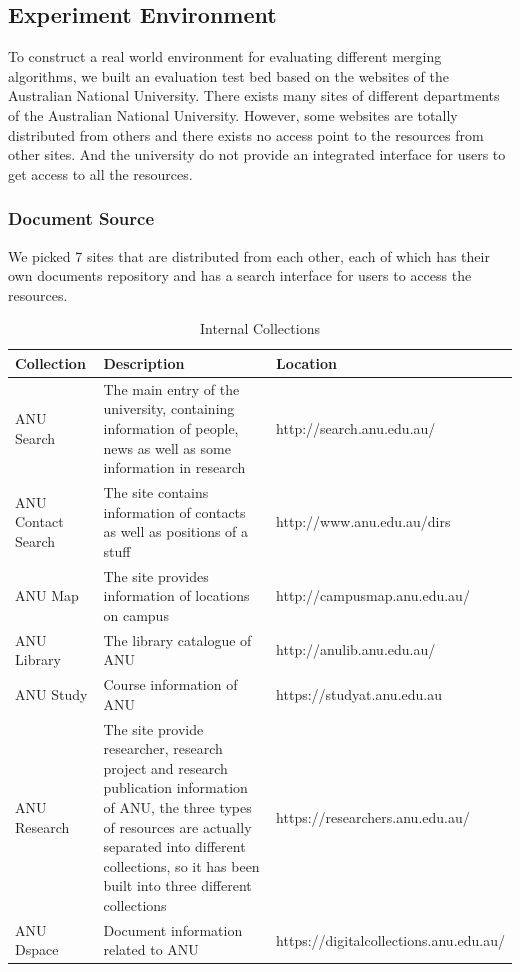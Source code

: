 \subsection{Experiment Environment}
To construct a real world environment for evaluating different merging algorithms, we built an evaluation test bed based on the websites of the Australian National University. There exists many sites of different departments of the Australian National University. However, some websites are totally distributed from others and there exists no access point to the resources from other sites. And the university do not provide an integrated interface for users to get access to all the resources. 
\subsubsection{Document Source}
We picked 7 sites that are distributed from each other, each of which has their own documents repository and has a search interface for users to access the resources.

\begin{table}
\begin{tabular}{|p{3cm}|p{5cm}|p{8cm}|}
\hline 
Collection & Description & Location \\ 
\hline 
ANU Search & The main entry of the university, containing information of people, news as well as some information in research & http://search.anu.edu.au/ \\ 
\hline 
ANU Contact Search & The site contains information of contacts as well as positions of a stuff   & http://www.anu.edu.au/dirs\\ 
\hline 
ANU Map & The site provides information of locations on campus & http://campusmap.anu.edu.au/ \\ 
\hline 
ANU Library & The library catalogue of ANU & http://anulib.anu.edu.au/ \\ 
\hline 
ANU Study & Course information of ANU & https://studyat.anu.edu.au \\ 
\hline 
ANU Research & The site provide researcher, research project and research publication information of ANU, the three types of resources are actually separated into different collections, so it has been built into three different collections & https://researchers.anu.edu.au/ \\ 
\hline 
ANU Dspace & Document information related to ANU & https://digitalcollections.anu.edu.au/ \\ 
\hline 
\end{tabular} 
\caption{Internal Collections}
\label{table:internal collection}
\end{table}


